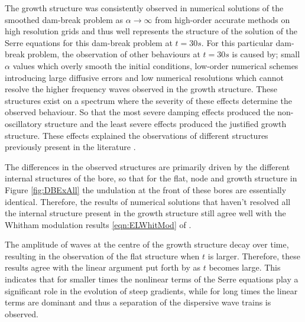 The growth structure was consistently observed in numerical solutions of the smoothed dam-break problem as $\alpha \rightarrow \infty$ from high-order accurate methods on high resolution grids and thus well represents the structure of the solution of the Serre equations for this dam-break problem at $t=30s$. For this particular dam-break problem, the observation of other behaviours at $t=30s$ is caused by; small $\alpha$ values which overly smooth the initial conditions, low-order numerical schemes introducing large diffusive errors and low numerical resolutions which cannot resolve the higher frequency waves observed in the growth structure. These structures exist on a spectrum  where the severity of these effects determine the observed behaviour. So that the most severe damping effects produced the non-oscillatory structure and the least severe effects produced the justified growth structure. These effects explained the observations of different structures previously present in the literature \cite{El-etal-2006,Hank-etal-2010-2034,Mitsotakis-etal-2014,Mitsotakis-etal-2017,doCarmo-etal-2018-404}. 

The differences in the observed structures are primarily driven by the different internal structures of the bore, so that for the flat, node and growth structure in Figure \ref{fig:DBExAll} the undulation at the front of these bores are essentially identical. Therefore, the results of numerical solutions that haven't resolved all the internal structure present in the growth structure still agree well with the Whitham modulation results \eqref{eqn:ELWhitMod} of \citet{El-etal-2006}.

The amplitude of waves at the centre of the growth structure decay over time, resulting in the observation of the flat structure  when $t$ is larger. Therefore, these results agree with the linear argument put forth by \citet{Dougalis-etal-2007} as $t$ becomes large. This indicates that for smaller times the nonlinear terms of the Serre equations play a significant role in the evolution of steep gradients, while for long times the linear terms are dominant and thus a separation of the dispersive wave trains is observed. 

